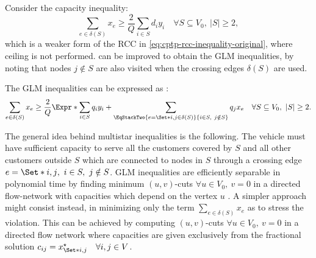 Consider the capacity inequality:
\begin{equation}
	\label{eq:cptpt-weaker-rcc}
	\sum_{e \in \delta(S)} x_e \ge \frac{2}{Q} \sum_{i \in S} d_i y_i \quad \forall S \subseteq V_0,\ |S| \ge 2,
\end{equation}
which is a weaker form of the RCC in \cref{eq:cptp-rcc-inequality-original},
where ceiling is not performed.
 can be improved to obtain the GLM inequalities,
by noting that  nodes $j \notin S$ are also visited when the crossing edges $\delta(S)$ are used.

The GLM inequalities can be expressed as \parencite{jepsen2014}:
\begin{equation}
	\label{eq:cptp-glm-inequality}
	\sum\limits_{e \in \delta(S)} x_e \ge \frac{2}{Q} \Expr*{
		\sum\limits_{i \in S} q_i y_i +
		\sum\limits_{\EqStackTwo{e = \Set*{i, j} \in \delta(S)}{i \in S,\ j \notin S}} q_j x_e
	}
	\quad \forall S \subseteq V_0,\ |S| \ge 2.
\end{equation}

The general idea behind multistar inequalities is the following.
The vehicle must have sufficient capacity to serve
all the customers covered by $S$
and all other customers outside $S$
which are connected to nodes in $S$ through a crossing edge $e = \Set*{i, j},\ i \in S,\ j \notin S$.
GLM inequalities are efficiently separable in
polynomial time by finding minimum
$(u, v)$-cuts $\forall u \in V_0,\ v = 0$
in a directed flow-network with capacities which depend on the vertex $u$
\parencite{letchford2006, jepsen2014}.
A simpler approach might consist instead,
in minimizing only the term $\sum_{e \in \delta(S)} x_e$ as to stress the violation.
This can be achieved by computing $(u, v)$-cuts $\forall u \in V_0,\ v = 0$
in a directed flow network where capacities are given exclusively from the
fractional solution $c_{ij} = x^\star _{\Set*{i, j}}\quad \forall i, j \in V$.
